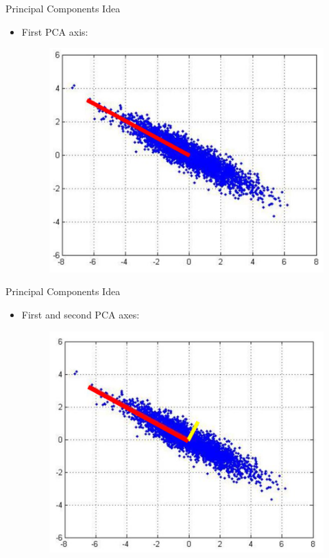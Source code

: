 \documentclass[serif, aspectratio=169]{beamer}
\begin{document}
\begin{frame}{Principal Components Idea}
    \begin{itemize}
        \item First PCA axis:
         \begin{figure}[htpb]
            \begin{center}
                \includegraphics[keepaspectratio, scale=1]{pic/pcaData1.JPG}
            \end{center}
        \end{figure}
    \end{itemize}
\end{frame}

\begin{frame}{Principal Components Idea}
    \begin{itemize}
        \item First and second PCA axes:
         \begin{figure}[htpb]
            \begin{center}
                \includegraphics[keepaspectratio, scale=1]{pic/pcaData2.JPG}
            \end{center}
        \end{figure}
    \end{itemize}
\end{frame}
\end{document}
